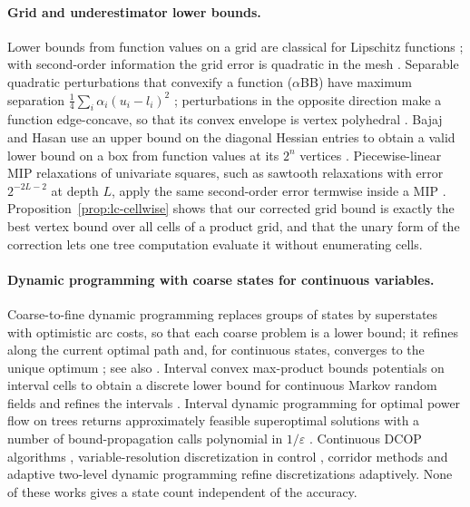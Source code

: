 \paragraph{Grid and underestimator lower bounds.}
Lower bounds from function values on a grid are classical for Lipschitz
functions \cite{Piyavskii1972,Shubert1972,Nesterov2004}; with second-order
information the grid error is quadratic in the mesh
\cite{DeKlerkLasserreLaurentSun2017}. Separable quadratic perturbations
that convexify a function ($\alpha$BB) have maximum separation
$\frac14\sum_i\alpha_i(u_i-l_i)^2$
\cite{MaranasFloudas1994,AndroulakisMaranasFloudas1995,AdjimanEtAl1998};
perturbations in the opposite direction make a function edge-concave, so
that its convex envelope is vertex polyhedral
\cite{Tardella2004,MeyerFloudas2005,Hasan2018,MisenerFloudas2012}. Bajaj
and Hasan use an upper bound on the diagonal Hessian entries to obtain a
valid lower bound on a box from function values at its $2^n$ vertices
\cite{BajajHasan2020}. Piecewise-linear MIP relaxations of univariate
squares, such as sawtooth relaxations with error $2^{-2L-2}$ at depth $L$,
apply the same second-order error termwise inside a MIP
\cite{BeachHildebrandHuchette2022,BeachEtAl2024,DongLuo2018}.
Proposition~\ref{prop:lc-cellwise} shows that our corrected grid bound is
exactly the best vertex bound over all cells of a product grid, and that
the unary form of the correction lets one tree computation evaluate it
without enumerating cells.

\paragraph{Dynamic programming with coarse states for continuous variables.}
Coarse-to-fine dynamic programming replaces groups of states by
superstates with optimistic arc costs, so that each coarse problem is a
lower bound; it refines along the current optimal path and, for continuous
states, converges to the unique optimum \cite{Raphael2001}; see also
\cite{FelzenszwalbMcAllester2007}. Interval convex max-product bounds
potentials on interval cells to obtain a discrete lower bound for
continuous Markov random fields and refines the intervals
\cite{PengEtAl2011}. Interval dynamic programming for optimal power flow on
trees returns approximately feasible superoptimal solutions with a number
of bound-propagation calls polynomial in $1/\varepsilon$
\cite[Theorem~2]{DvijothamEtAl2017}. Continuous DCOP algorithms
\cite{HoangEtAl2020,TroullinosEtAl2022}, variable-resolution
discretization in control \cite{MunosMoore2002}, corridor methods
\cite{HeidariEtAl1971} and adaptive two-level dynamic programming
\cite{LeaverFayKuhlmanSnoeyink2005} refine discretizations adaptively.
None of these works gives a state count independent of the accuracy.

